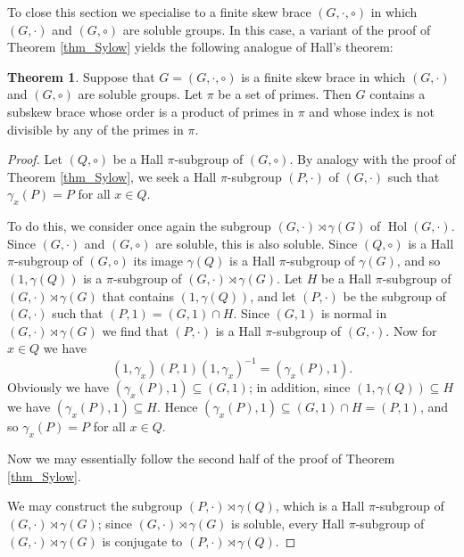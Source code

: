 \documentclass[12pt,a4paper, reqno]{amsart}
\theoremstyle{definition}
\newtheorem{theorem}{Theorem}[section]
\DeclareMathOperator{\Hol}{\mbox{Hol}}
\begin{document}
To close this section we specialise to a finite skew brace $(G,\cdot,\circ) $ in which $ (G,\cdot) $ and $ (G,\circ) $ are soluble groups. In this case, a variant of the proof of Theorem \ref{thm_Sylow} yields the following analogue of Hall's theorem:

\begin{theorem} \label{thm_Hall}
Suppose that $ G=(G,\cdot,\circ) $ is a finite skew brace in which $ (G,\cdot) $ and $ (G,\circ) $ are soluble groups. Let $ \pi $ be a set of primes. Then $ G $ contains a subskew brace whose order is a product of primes in $ \pi $ and whose index is not divisible by any of the primes in $ \pi $. 
\end{theorem}
\begin{proof}
Let $ (Q,\circ) $ be a Hall $ \pi $-subgroup of $ (G,\circ) $. By analogy with the proof of Theorem \ref{thm_Sylow}, we seek a Hall $ \pi $-subgroup $ (P,\cdot) $ of $ (G,\cdot) $ such that $ \gamma_{x}(P)=P $ for all $ x \in Q $.

To do this, we consider once again the subgroup $ (G,\cdot) \rtimes \gamma(G) $ of $ \Hol(G,\cdot) $. Since $ (G,\cdot) $ and $ (G,\circ) $ are soluble, this is also soluble. Since $ (Q,\circ) $ is a Hall $ \pi $-subgroup of $ (G,\circ) $ its image $ \gamma(Q) $ is a Hall $ \pi $-subgroup of $ \gamma(G) $, and so $ (1,\gamma(Q)) $ is a $ \pi $-subgroup of $ (G,\cdot) \rtimes \gamma(G) $. Let $ H $ be a Hall $ \pi $-subgroup of $ (G,\cdot) \rtimes \gamma(G) $ that contains $ (1,\gamma(Q)) $, and let $ (P,\cdot) $ be the subgroup of $ (G,\cdot) $ such that $ (P,1) = (G,1) \cap H $. Since $ (G,1) $ is normal in $ (G,\cdot) \rtimes \gamma(G) $ we find that $ (P,\cdot) $ is a Hall $ \pi $-subgroup of $ (G,\cdot) $. Now for $ x \in Q $ we have
\[ (1,\gamma_{x})(P,1)(1,\gamma_{x})^{-1} = (\gamma_{x}(P),1). \]
Obviously we have $ (\gamma_{x}(P),1) \subseteq (G,1) $; in addition, since $ (1,\gamma(Q)) \subseteq H $ we have $ (\gamma_{x}(P),1) \subseteq H $. Hence $ (\gamma_{x}(P),1) \subseteq (G,1) \cap H = (P,1) $, and so $ \gamma_{x}(P) = P $ for all $ x \in Q $. 

Now we may essentially follow the second half of the proof of Theorem \ref{thm_Sylow}. 

We may construct the subgroup $ (P,\cdot) \rtimes \gamma(Q) $, which is a Hall $ \pi $-subgroup of $ (G,\cdot) \rtimes \gamma(G) $; since $ (G,\cdot) \rtimes \gamma(G) $  is soluble, every Hall $ \pi $-subgroup of $ (G,\cdot) \rtimes \gamma(G) $ is conjugate to $ (P,\cdot) \rtimes \gamma(Q) $. 


\end{proof}
\end{document}
